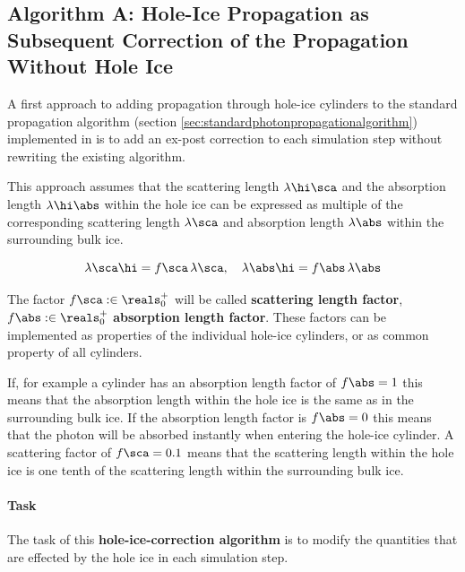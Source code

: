 
\subsection{Algorithm A: Hole-Ice Propagation as Subsequent Correction of the Propagation Without Hole Ice}
\label{sec:algorithm_a}


A first approach to adding propagation through hole-ice cylinders to the standard propagation algorithm (section \ref{sec:standardphotonpropagationalgorithm}) implemented in \clsim is to add an ex-post correction to each simulation step without rewriting the existing algorithm.


This approach assumes that the scattering length $\lambda\hi\sca$ and the absorption length $\lambda\hi\abs$ within the hole ice can be expressed as multiple of the corresponding scattering length $\lambda\sca$ and absorption length $\lambda\abs$ within the surrounding bulk ice.

$$
  \lambda\sca\hi = f\sca \, \lambda\sca, \ \ \ \lambda\abs\hi = f\abs \, \lambda\abs
$$

The factor $f\sca :\in \reals^+_0$ will be called \textbf{scattering length factor}, $f\abs :\in \reals^+_0$ \textbf{absorption length factor}. These factors can be implemented as properties of the individual hole-ice cylinders, or as common property of all cylinders.

If, for example a cylinder has an absorption length factor of $f\abs = 1$ this means that the absorption length within the hole ice is the same as in the surrounding bulk ice. If the absorption length factor is $f\abs = 0$ this means that the photon will be absorbed instantly when entering the hole-ice cylinder. A scattering factor of $f\sca=0.1$ means that the scattering length within the hole ice is one tenth of the scattering length within the surrounding bulk ice.

\paragraph{Task} The task of this \textbf{hole-ice-correction algorithm} is to modify the quantities that are effected by the hole ice in each simulation step.

